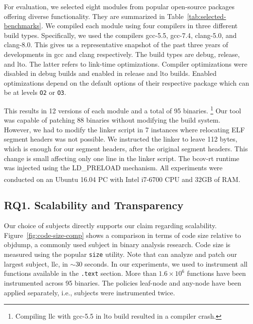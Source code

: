 For evaluation, we selected eight modules from popular open-source packages offering diverse functionality.
They are summarized in Table~\ref{tab:selected-benchmarks}.
We compiled each module using four compilers in three different build types.
Specifically, we used the compilers \textsf{gcc-5.5}, \textsf{gcc-7.4}, \textsf{clang-5.0}, and \textsf{clang-8.0}.
This gives us a representative snapshot of the past three years of developments in \textsf{gcc} and \textsf{clang} respectively.
The build types are \textsf{debug}, \textsf{release}, and \textsf{lto}.
The latter refers to link-time optimizations.
Compiler optimizations were disabled in \textsf{debug} builds and enabled in \textsf{release} and \textsf{lto} builds.
Enabled optimizations depend on the default options of their respective package which can  be at levels \texttt{O2} or \texttt{O3}.



This results in 12 versions of each module and a total of 95 binaries.
\footnote{Compiling \textsf{llc} with \textsf{gcc-5.5} in \textsf{lto} build resulted in a compiler crash.}
Our tool was capable of patching 88 binaries without modifying the build system.
However, we had to modify the linker script in 7 instances where relocating ELF segment headers was not possible. 
We instructed the linker to leave 112 bytes, which is enough for our segment headers, after the original segment headers.
This change is small affecting only one line in the linker script.
The \mbox{\textsf{bcov-rt}} runtime was injected using the LD\_PRELOAD mechanism.
All experiments were conducted on an Ubuntu 16.04 PC with Intel\textsuperscript{\textregistered} i7-6700 CPU and 32GB of RAM.

\subsection*{RQ1. Scalability and Transparency}
Our choice of subjects directly supports our claim regarding scalability.
Figure~\ref{fig:code-size-comp} shows a comparison in terms of code size relative to \textsf{objdump}, a commonly used subject in binary analysis research.
Code size is measured using the popular \texttt{size} utility.
Note that {\bcov} can analyze and patch our largest subject, \textsf{llc}, in $\sim$30 seconds.
In our experiments, we used {\bcov} to instrument all functions  available in the \texttt{.text} section.
More than $1.6\times10^6$ functions have been instrumented across 95 binaries.
The policies leaf-node and any-node have been applied separately, i.e., subjects were instrumented twice.


